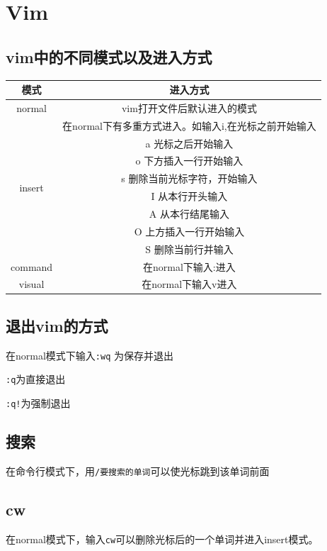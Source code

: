 \documentclass[UTF8,a4paper]{ctexart}
\begin{document}
\section{Vim}
\subsection{vim中的不同模式以及进入方式}
\begin{tabular}{c|c}
    
    模式 & 进入方式\\
    \hline
    normal & vim打开文件后默认进入的模式\\
    \hline
    \multirow{8}{*}{insert} & 在normal下有多重方式进入。如输入i,在光标之前开始输入\\ 
    & a 光标之后开始输入\\ 
    & o 下方插入一行开始输入\\
    & s 删除当前光标字符，开始输入\\
    & I 从本行开头输入\\
    & A 从本行结尾输入\\
    & O 上方插入一行开始输入\\
    & S 删除当前行并输入\\ 
    \hline
    command & 在normal下输入:进入\\
    \hline
    visual & 在normal下输入v进入\\
\end{tabular}

\subsection{退出vim的方式}
在normal模式下输入\verb|:wq| 为保存并退出\par
\verb|:q|为直接退出\par
\verb|:q!|为强制退出

\subsection{搜索}
在命令行模式下，用\quad \verb|/要搜索的单词|\quad 可以使光标跳到该单词前面

\subsection{cw}
在normal模式下，输入\verb|cw|可以删除光标后的一个单词并进入insert模式。
\end{document}
